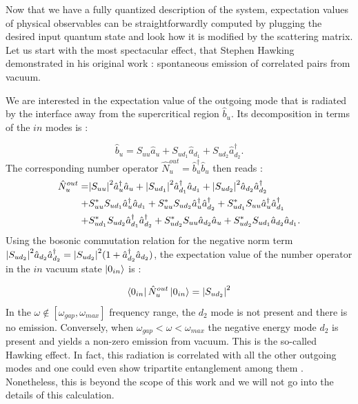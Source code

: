\label{subsec:spontaneous_emission}

Now that we have a fully quantized description of the system, expectation values of physical observables can be straightforwardly
computed by plugging the desired input quantum state and look how it is modified by the scattering matrix. Let us start with the most spectacular effect, that
Stephen Hawking demonstrated in his original work \cite{hawking_black_1972} : spontaneous emission of correlated pairs from vacuum.


We are interested in the expectation value of the outgoing mode that is radiated by the interface away from the supercritical region $\hat{b}_u$.
Its decomposition in terms of the $in$ modes is :

\begin{equation}
    \hat{b}_u = S_{uu}\hat{a}_u + S_{ud_1}\hat{a}_{d_1} + S_{ud_2}\hat{a}_{d_2}^\dagger.
\end{equation}
The corresponding number operator $\hat{N}_u^{out}=\hat{b}_u^\dagger\hat{b}_u$ then reads :
\begin{equation}
    \begin{aligned}
        \hat{N}_u^{out} = &\abs{S_{uu}}^2\hat{a}_u^\dagger\hat{a}_u + \abs{S_{ud_1}}^2\hat{a}_{d_1}^\dagger\hat{a}_{d_1} + \abs{S_{ud_2}}^2\hat{a}_{d_2}\hat{a}_{d_2}^\dagger \\ 
        + & S_{uu}^*S_{ud_1}\hat{a}_u^\dagger\hat{a}_{d_1}+ S_{uu}^*S_{ud_2}\hat{a}_u^\dagger\hat{a}_{d_2}^\dagger + S_{ud_1}^*S_{uu}\hat{a}_u^\dagger\hat{a}_{d_1}^\dagger  \\
        + & S_{ud_1}^*S_{ud_2}\hat{a}_{d_1}^\dagger\hat{a}_{d_2}^\dagger+ S_{ud_2}^*S_{uu}\hat{a}_{d_2}\hat{a}_u+ S_{ud_2}^*S_{ud_1}\hat{a}_{d_2}\hat{a}_{d_1}. 
    \end{aligned}
\end{equation}
Using the bosonic commutation relation for the negative norm term $\abs{S_{ud_2}}^2\hat{a}_{d_2}\hat{a}_{d_2}^\dagger=\abs{S_{ud_2}}^2(1+\hat{a}_{d_2}^\dagger\hat{a}_{d_2})$, the expectation
value of the number operator in the $in$ vacuum state $\ket{0_{in}}$ is :

\begin{equation}
    \bra{0_{in}}\hat{N}_u^{out}\ket{0_{in}} = \abs{S_{ud_2}}^2 
\end{equation}
In the $\omega \notin [\omega_{gap}, \omega_{max}]$ frequency range, the $d_2$ mode is not present and there is no emission. Conversely, when $\omega_{gap}<\omega<\omega_{max}$ 
the negative energy mode $d_2$ is present and yields a non-zero emission from vacuum. This is the so-called Hawking effect. In fact,
 this radiation is correlated with all the other outgoing modes and one could even show tripartite entanglement among them \cite{isoard_quantum_2019}. Nonetheless, this is beyond the
 scope of this work and we will not go into the details of this calculation.

